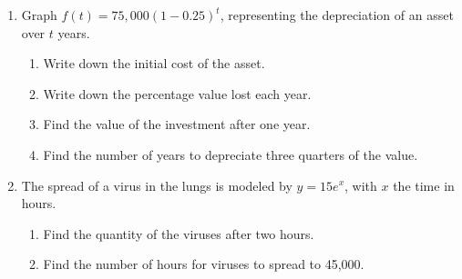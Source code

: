 \documentclass[12pt, twoside]{article}
\begin{document}
\begin{enumerate}
\item Graph $\displaystyle f(t)=75,000 \left( 1-0.25 \right)^t$, representing the depreciation of an asset over $t$ years.
\begin{multicols}{2}
    \begin{enumerate}[itemsep=1.2cm]
        \item Write down the initial cost of the asset.
        \item Write down the percentage value lost each year.
        \item Find the value of the investment after one year.\vspace{1cm}
        \item Find the number of years to depreciate three quarters of the value.
    \end{enumerate}
    \begin{center}
    \end{center}
    \end{multicols}

\newpage
\item The spread of a virus in the lungs is modeled by $\displaystyle y= 15 e^x$, with $x$ the time in hours. 
\begin{enumerate}[itemsep=1cm]
    \item Find the quantity of the viruses after two hours.
    \item Find the number of hours for viruses to spread to 45,000.
\end{enumerate} \vspace{2cm}


\end{enumerate}
\end{document}
